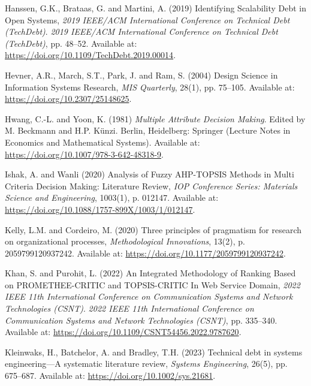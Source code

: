 \documentclass[
  12pt,
  letterpaper,
  12pt,
  oneside,
  english,
  onehalfspacing,
  headsepline]{MastersDoctoralThesis}
\newlength{\cslhangindent}
\newenvironment{CSLReferences}[2] %
 {\begin{list}{}{%
  \setlength{\itemindent}{0pt}
  \setlength{\leftmargin}{0pt}
  \setlength{\parsep}{0pt}
  \ifodd #1
   \setlength{\leftmargin}{\cslhangindent}
   \setlength{\itemindent}{-1\cslhangindent}
  \fi
  \setlength{\itemsep}{#2\baselineskip}}}
 {\end{list}}
\begin{document}
\begin{CSLReferences}{0}{1}
Hanssen, G.K., Brataas, G. and Martini, A. (2019)
\textquotesingle Identifying {Scalability Debt} in {Open
Systems}\textquotesingle, \emph{2019 {IEEE}/{ACM International
Conference} on {Technical Debt} ({TechDebt})}. \emph{2019 {IEEE}/{ACM
International Conference} on {Technical Debt} ({TechDebt})}, pp. 48--52.
Available at: \url{https://doi.org/10.1109/TechDebt.2019.00014}.

Hevner, A.R., March, S.T., Park, J. and Ram, S. (2004)
\textquotesingle Design {Science} in {Information Systems
Research}\textquotesingle, \emph{MIS Quarterly}, 28(1), pp. 75--105.
Available at: \url{https://doi.org/10.2307/25148625}.

Hwang, C.-L. and Yoon, K. (1981) \emph{Multiple {Attribute Decision
Making}}. Edited by M. Beckmann and H.P. Künzi. Berlin, Heidelberg:
Springer (Lecture {Notes} in {Economics} and {Mathematical Systems}).
Available at: \url{https://doi.org/10.1007/978-3-642-48318-9}.

Ishak, A. and Wanli (2020) \textquotesingle Analysis of {Fuzzy
AHP-TOPSIS Methods} in {Multi Criteria Decision Making}: {Literature
Review}\textquotesingle, \emph{IOP Conference Series: Materials Science
and Engineering}, 1003(1), p. 012147. Available at:
\url{https://doi.org/10.1088/1757-899X/1003/1/012147}.

Kelly, L.M. and Cordeiro, M. (2020) \textquotesingle Three principles of
pragmatism for research on organizational processes\textquotesingle,
\emph{Methodological Innovations}, 13(2), p. 2059799120937242. Available
at: \url{https://doi.org/10.1177/2059799120937242}.

Khan, S. and Purohit, L. (2022) \textquotesingle An {Integrated
Methodology} of {Ranking Based} on {PROMETHEE-CRITIC} and {TOPSIS-CRITIC
In Web Service Domain}\textquotesingle, \emph{2022 {IEEE} 11th
{International Conference} on {Communication Systems} and {Network
Technologies} ({CSNT})}. \emph{2022 {IEEE} 11th {International
Conference} on {Communication Systems} and {Network Technologies}
({CSNT})}, pp. 335--340. Available at:
\url{https://doi.org/10.1109/CSNT54456.2022.9787620}.

Kleinwaks, H., Batchelor, A. and Bradley, T.H. (2023)
\textquotesingle Technical debt in systems engineering---{A} systematic
literature review\textquotesingle, \emph{Systems Engineering}, 26(5),
pp. 675--687. Available at: \url{https://doi.org/10.1002/sys.21681}.


\end{CSLReferences}
\end{document}
